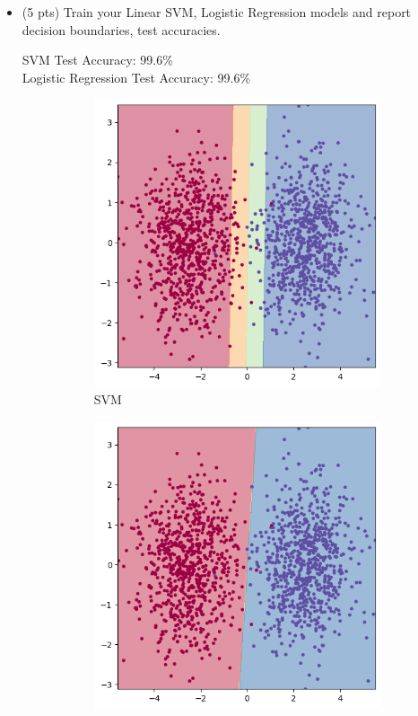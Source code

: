 \documentclass[a4paper]{article}
\theoremstyle{definition}
\newenvironment{soln}{
    \leavevmode\color{blue}\ignorespaces
}{}
\begin{document}
 \begin{itemize}
     \item (5 pts) Train your Linear SVM, Logistic Regression models and report decision boundaries, test accuracies. 
     \begin{soln}
         SVM Test Accuracy: 99.6\% \\
         Logistic Regression Test Accuracy: 99.6\%
         \begin{figure}[H]
            \centering
            \begin{subfigure}[b]{0.5\textwidth}
                \centering
                \includegraphics[scale=0.3]{Images/q2_2_1/SVM.png}
                \caption{SVM}
            \end{subfigure}%
            \begin{subfigure}[b]{0.5\textwidth}
                \centering
                \includegraphics[scale=0.3]{Images/q2_2_1/Logistic.png}

\end{subfigure}
\end{figure}
\end{soln}
\end{itemize}
\end{document}
